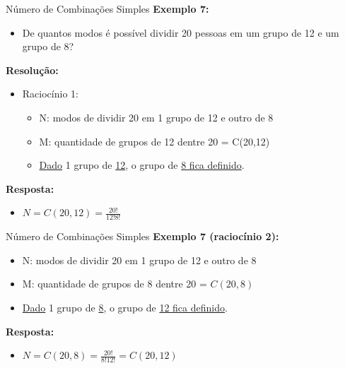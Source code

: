 \documentclass[aspectratio=169]{beamer}
\begin{document}
\begin{frame}{Número de Combinações Simples}
    \textbf{Exemplo 7:}
    \begin{itemize}
        \item[] De quantos modos é possível dividir 20 pessoas em um grupo de 12 e um grupo de 8?
    \end{itemize}

    \pause
    \vspace{2mm}

    \textbf{Resolução:}
    \begin{itemize}
        \item[] Raciocínio 1:
        \begin{itemize}
            \item N: modos de dividir 20 em 1 grupo de 12 e outro de 8 \pause
            \item M: quantidade de grupos de 12 dentre 20 = C(20,12) \pause
            \item \underline{Dado} 1 grupo de \underline{12}, o grupo de \underline{8 fica definido}.
        \end{itemize}
    \end{itemize}

    \pause
    \vspace{2mm}
    \textbf{Resposta:}

    \begin{itemize}
        \item $N = C(20,12) = \frac{20!}{12! 8!}$
    \end{itemize}

\end{frame}


\begin{frame}{Número de Combinações Simples}
    \textbf{Exemplo 7 (raciocínio 2):}
    \begin{itemize}
        \item N: modos de dividir 20 em 1 grupo de 12 e outro de 8
        \item M: quantidade de grupos de 8 dentre 20 = $C(20,8)$ \pause
        \item \underline{Dado} 1 grupo de \underline{8}, o grupo de \underline{12 fica definido}.
    \end{itemize}

    \pause
    \vspace{2mm}

    \textbf{Resposta:}

    \begin{itemize}
        \item $N = C(20,8) = \frac{20!}{8! 12!} = C(20,12)$
    \end{itemize}

\end{frame}
\end{document}
